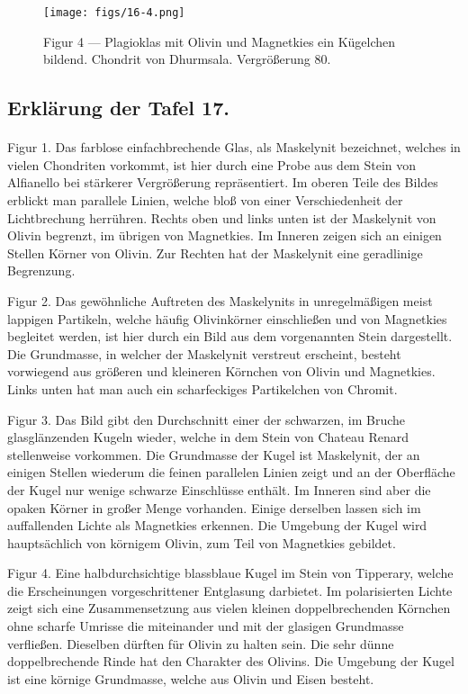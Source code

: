 \documentclass[a4paper, 11pt, oneside, polutonikogreek, german]{article}
\begin{document}
\vspace*{\fill}
\begin{figure}[H]
\centering
\texttt{[image: figs/16-4.png]}
\caption{\small Figur 4 --- Plagioklas mit Olivin und Magnetkies ein Kügelchen bildend. Chondrit von Dhurmsala. Vergrößerung 80.}
\end{figure}
\vspace*{\fill} 
\clearpage

\subsection{Erklärung der Tafel 17.}
\paragraph{}
Figur 1. Das farblose einfachbrechende Glas, als Maskelynit bezeichnet, welches in vielen Chondriten vorkommt, ist hier durch eine Probe aus dem Stein von Alfianello bei stärkerer Vergrößerung repräsentiert. Im oberen Teile des Bildes erblickt man parallele Linien, welche bloß von einer Verschiedenheit der Lichtbrechung herrühren. Rechts oben und links unten ist der Maskelynit von Olivin begrenzt, im übrigen von Magnetkies. Im Inneren zeigen sich an einigen Stellen Körner von Olivin. Zur Rechten hat der Maskelynit eine geradlinige Begrenzung.

Figur 2. Das gewöhnliche Auftreten des Maskelynits in unregelmäßigen meist lappigen Partikeln, welche häufig Olivinkörner einschließen und von Magnetkies begleitet werden, ist hier durch ein Bild aus dem vorgenannten Stein dargestellt. Die Grundmasse, in welcher der Maskelynit verstreut erscheint, besteht vorwiegend aus größeren und kleineren Körnchen von Olivin und Magnetkies. Links unten hat man auch ein scharfeckiges Partikelchen von Chromit.

Figur 3. Das Bild gibt den Durchschnitt einer der schwarzen, im Bruche glasglänzenden Kugeln wieder, welche in dem Stein von Chateau Renard stellenweise vorkommen. Die Grundmasse der Kugel ist Maskelynit, der an einigen Stellen wiederum die feinen parallelen Linien zeigt und an der Oberfläche der Kugel nur wenige schwarze Einschlüsse enthält. Im Inneren sind aber die opaken Körner in großer Menge vorhanden. Einige derselben lassen sich im auffallenden Lichte als Magnetkies erkennen. Die Umgebung der Kugel wird hauptsächlich von körnigem Olivin, zum Teil von Magnetkies gebildet.

Figur 4. Eine halbdurchsichtige blassblaue Kugel im Stein von Tipperary, welche die Erscheinungen vorgeschrittener Entglasung darbietet. Im polarisierten Lichte zeigt sich eine Zusammensetzung aus vielen kleinen doppelbrechenden Körnchen ohne scharfe Umrisse die miteinander und mit der glasigen Grundmasse verfließen. Dieselben dürften für Olivin zu halten sein. Die sehr dünne doppelbrechende Rinde hat den Charakter des Olivins. Die Umgebung der Kugel ist eine körnige Grundmasse, welche aus Olivin und Eisen besteht.
\clearpage
\end{document}
